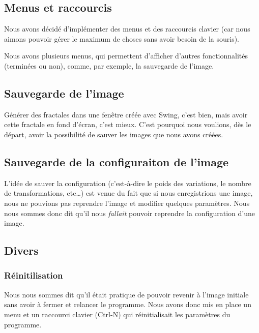 \documentclass[a4paper]{article}
\begin{document}
\subsection*{Menus et raccourcis}
Nous avons décidé d'implémenter des menus et des raccourcis clavier (car nous aimons pouvoir gérer le maximum de choses sans avoir besoin de la souris).

Nous avons plusieurs menus, qui permettent d'afficher d'autres fonctionnalités (terminées ou non), comme, par exemple, la sauvegarde de l'image.

\subsection*{Sauvegarde de l'image}
Générer des fractales dans une fenêtre créée avec Swing, c'est bien, mais avoir cette fractale en fond d'écran, c'est mieux. C'est pourquoi nous voulions, dès le départ, avoir la possibilité de sauver les images que nous avons créées.

\subsection*{Sauvegarde de la configuraiton de l'image}
L'idée de sauver la configuration (c'est-à-dire le poids des variations, le nombre de transformations, etc\ldots) est venue du fait que si nous enregistrions une image, nous ne pouvions pas reprendre l'image et modifier quelques paramètres. Nous nous sommes donc dit qu'il nous \textit{fallait} pouvoir reprendre la configuration d'une image.

\subsection*{Divers}
\subsubsection*{Réinitilisation}
Nous nous sommes dit qu'il était pratique de pouvoir revenir à l'image initiale sans avoir à fermer et relancer le programme. Nous avons donc mis en place un menu et un raccourci clavier (Ctrl-N) qui réinitialisait les paramètres du programme.

\subsubsection*{}

\subsubsection*{}

\subsection*{}
\end{document}
